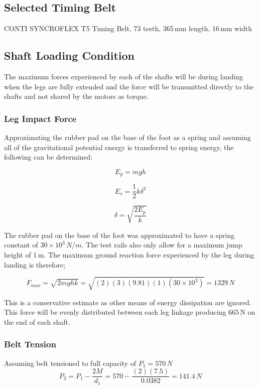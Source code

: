 \documentclass[11pt, titlepage]{article}
\begin{document}
\subsection{Selected Timing Belt}
CONTI SYNCROFLEX T5 Timing Belt, 73 teeth, 365\,mm length, 16\,mm width

\newpage
\subsection{Shaft Loading Condition}
The maximum forces experienced by each of the shafts will be during landing when the legs are fully extended and the force will be transmitted directly to the shafts and not shared by the motors as torque.

\subsubsection{Leg Impact Force}
Approximating the rubber pad on the base of the foot as a spring and assuming all of the gravitational potential energy is transferred to spring energy, the following can be determined:

\begin{equation}
	E_p = mgh
\end{equation}

\begin{equation}
	E_s = \frac{1}{2}k\delta^2
\end{equation}

\begin{equation}
	\delta = \sqrt{\frac{2E_p}{k}}
\end{equation}

The rubber pad on the base of the foot was approximated to have a spring constant of $30\times10^3\,N/m$. The test rails also only allow for a maximum jump height of 1\,m. The maximum ground reaction force experienced by the leg during landing is therefore;

\begin{equation}
	F_{max} = \sqrt{2mghk} = \sqrt{(2)(3)(9.81)(1)(30\times10^3)} = 1329\,N
\end{equation}

This is a conservative estimate as other means of energy dissipation are ignored. This force will be evenly distributed between each leg linkage producing 665\,N on the end of each shaft.

\subsubsection{Belt Tension}
Assuming belt tensioned to full capacity of $P_1 = 570\,N$
\begin{equation}
	P_2 = P_1-\frac{2M}{d_1} = 570 - \frac{(2)(7.5)}{0.0382} = 141.4\,N
\end{equation}
\end{document}
